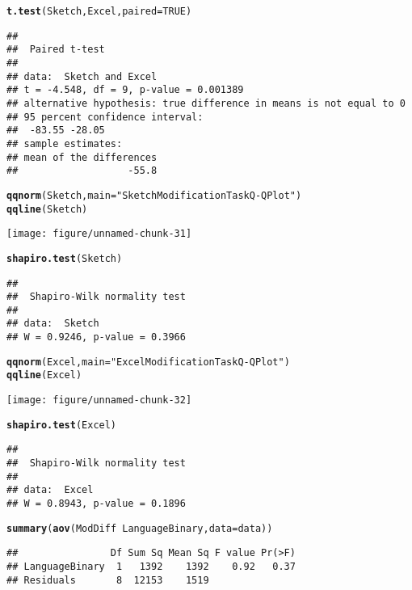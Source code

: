 \documentclass[12pt, twoside, a4paper, openright]{report}\usepackage[]{graphicx}\usepackage[]{color}
\makeatletter
\def\maxwidth{ %
  \ifdim\Gin@nat@width>\linewidth
    \linewidth
  \else
    \Gin@nat@width
  \fi
}
\newcommand{\hlnum}[1]{\textcolor[rgb]{0.686,0.059,0.569}{#1}}%
\newcommand{\hlstr}[1]{\textcolor[rgb]{0.192,0.494,0.8}{#1}}%
\newcommand{\hlopt}[1]{\textcolor[rgb]{0,0,0}{#1}}%
\newcommand{\hlstd}[1]{\textcolor[rgb]{0.345,0.345,0.345}{#1}}%
\newcommand{\hlkwc}[1]{\textcolor[rgb]{0.333,0.667,0.333}{#1}}%
\newcommand{\hlkwd}[1]{\textcolor[rgb]{0.737,0.353,0.396}{\textbf{#1}}}%
\newenvironment{kframe}{%
 \def\at@end@of@kframe{}%
 \ifinner\ifhmode%
  \def\at@end@of@kframe{\end{minipage}}%
  \begin{minipage}{\columnwidth}%
 \fi\fi%
 \def\FrameCommand##1{\hskip\@totalleftmargin \hskip-\fboxsep
 \colorbox{shadecolor}{##1}\hskip-\fboxsep
     \hskip-\linewidth \hskip-\@totalleftmargin \hskip\columnwidth}%
 \MakeFramed {\advance\hsize-\width
   \@totalleftmargin\z@ \linewidth\hsize
   \@setminipage}}%
 {\par\unskip\endMakeFramed%
 \at@end@of@kframe}
\newenvironment{knitrout}{}{} %
\makeatother
\begin{document}
\begin{knitrout}
\color{fgcolor}\begin{kframe}
\begin{alltt}
\hlkwd{t.test}\hlstd{(Sketch, Excel,} \hlkwc{paired} \hlstd{=} \hlnum{TRUE}\hlstd{)}
\end{alltt}
\begin{verbatim}
## 
## 	Paired t-test
## 
## data:  Sketch and Excel
## t = -4.548, df = 9, p-value = 0.001389
## alternative hypothesis: true difference in means is not equal to 0
## 95 percent confidence interval:
##  -83.55 -28.05
## sample estimates:
## mean of the differences 
##                   -55.8
\end{verbatim}
\begin{alltt}
\hlkwd{qqnorm}\hlstd{(Sketch,} \hlkwc{main} \hlstd{=} \hlstr{"Sketch Modification Task Q-Q Plot"}\hlstd{)}
\hlkwd{qqline}\hlstd{(Sketch)}
\end{alltt}
\end{kframe}
\texttt{[image: figure/unnamed-chunk-31]} 
\begin{kframe}\begin{alltt}
\hlkwd{shapiro.test}\hlstd{(Sketch)}
\end{alltt}
\begin{verbatim}
## 
## 	Shapiro-Wilk normality test
## 
## data:  Sketch
## W = 0.9246, p-value = 0.3966
\end{verbatim}
\begin{alltt}
\hlkwd{qqnorm}\hlstd{(Excel,} \hlkwc{main} \hlstd{=} \hlstr{"Excel Modification Task Q-Q Plot"}\hlstd{)}
\hlkwd{qqline}\hlstd{(Excel)}
\end{alltt}
\end{kframe}
\texttt{[image: figure/unnamed-chunk-32]} 
\begin{kframe}\begin{alltt}
\hlkwd{shapiro.test}\hlstd{(Excel)}
\end{alltt}
\begin{verbatim}
## 
## 	Shapiro-Wilk normality test
## 
## data:  Excel
## W = 0.8943, p-value = 0.1896
\end{verbatim}
\begin{alltt}
\hlkwd{summary}\hlstd{(}\hlkwd{aov}\hlstd{(ModDiff} \hlopt{~} \hlstd{LanguageBinary,} \hlkwc{data} \hlstd{= data))}
\end{alltt}
\begin{verbatim}
##                Df Sum Sq Mean Sq F value Pr(>F)
## LanguageBinary  1   1392    1392    0.92   0.37
## Residuals       8  12153    1519
\end{verbatim}
\end{kframe}
\end{knitrout}





\end{document}
